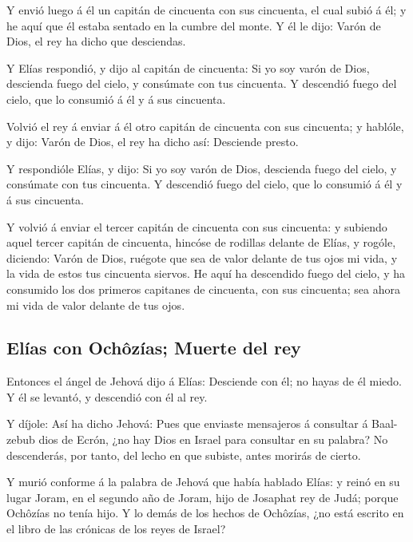  Y envió luego á él un capitán de cincuenta con sus
cincuenta, el cual subió á él; y he aquí que él estaba sentado en la
cumbre del monte. Y él le dijo: Varón de Dios, el rey ha dicho que
desciendas.

 Y Elías respondió, y dijo al capitán de cincuenta: Si yo
soy varón de Dios, descienda fuego del cielo, y consúmate con tus
cincuenta. Y descendió fuego del cielo, que lo consumió á él y á sus
cincuenta.

 Volvió el rey á enviar á él otro capitán de cincuenta con
sus cincuenta; y hablóle, y dijo: Varón de Dios, el rey ha dicho así:
Desciende presto.

 Y respondióle Elías, y dijo: Si yo soy varón de Dios,
descienda fuego del cielo, y consúmate con tus cincuenta. Y descendió
fuego del cielo, que lo consumió á él y á sus cincuenta.

 Y volvió á enviar el tercer capitán de cincuenta con sus
cincuenta: y subiendo aquel tercer capitán de cincuenta, hincóse de
rodillas delante de Elías, y rogóle, diciendo: Varón de Dios, ruégote
que sea de valor delante de tus ojos mi vida, y la vida de estos tus
cincuenta siervos.  He aquí ha descendido fuego del cielo,
y ha consumido los dos primeros capitanes de cincuenta, con sus
cincuenta; sea ahora mi vida de valor delante de tus ojos.

\hypertarget{eluxedas-con-ochuxf4zuxedas-muerte-del-rey}{%
\subsection{Elías con Ochôzías; Muerte del
rey}\label{eluxedas-con-ochuxf4zuxedas-muerte-del-rey}}

 Entonces el ángel de Jehová dijo á Elías: Desciende con
él; no hayas de él miedo. Y él se levantó, y descendió con él al rey.

 Y díjole: Así ha dicho Jehová: Pues que enviaste
mensajeros á consultar á Baal-zebub dios de Ecrón, ¿no hay Dios en
Israel para consultar en su palabra? No descenderás, por tanto, del
lecho en que subiste, antes morirás de cierto.

 Y murió conforme á la palabra de Jehová que había hablado
Elías: y reinó en su lugar Joram, en el segundo año de Joram, hijo de
Josaphat rey de Judá; porque Ochôzías no tenía hijo.  Y lo
demás de los hechos de Ochôzías, ¿no está escrito en el libro de las
crónicas de los reyes de Israel?

